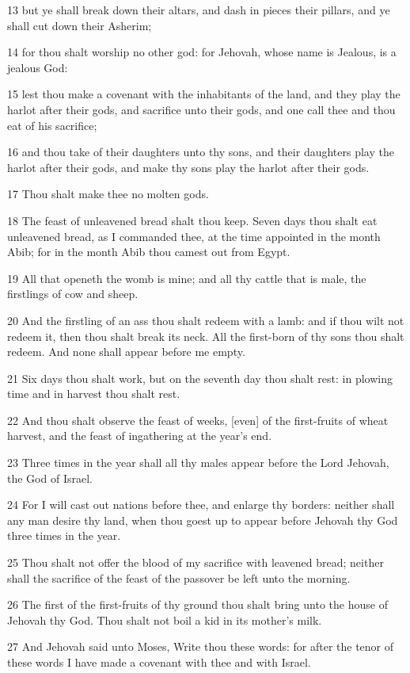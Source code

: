 \par 13 but ye shall break down their altars, and dash in pieces their pillars, and ye shall cut down their Asherim;
\par 14 for thou shalt worship no other god: for Jehovah, whose name is Jealous, is a jealous God:
\par 15 lest thou make a covenant with the inhabitants of the land, and they play the harlot after their gods, and sacrifice unto their gods, and one call thee and thou eat of his sacrifice;
\par 16 and thou take of their daughters unto thy sons, and their daughters play the harlot after their gods, and make thy sons play the harlot after their gods.
\par 17 Thou shalt make thee no molten gods.
\par 18 The feast of unleavened bread shalt thou keep. Seven days thou shalt eat unleavened bread, as I commanded thee, at the time appointed in the month Abib; for in the month Abib thou camest out from Egypt.
\par 19 All that openeth the womb is mine; and all thy cattle that is male, the firstlings of cow and sheep.
\par 20 And the firstling of an ass thou shalt redeem with a lamb: and if thou wilt not redeem it, then thou shalt break its neck. All the first-born of thy sons thou shalt redeem. And none shall appear before me empty.
\par 21 Six days thou shalt work, but on the seventh day thou shalt rest: in plowing time and in harvest thou shalt rest.
\par 22 And thou shalt observe the feast of weeks, [even] of the first-fruits of wheat harvest, and the feast of ingathering at the year's end.
\par 23 Three times in the year shall all thy males appear before the Lord Jehovah, the God of Israel.
\par 24 For I will cast out nations before thee, and enlarge thy borders: neither shall any man desire thy land, when thou goest up to appear before Jehovah thy God three times in the year.
\par 25 Thou shalt not offer the blood of my sacrifice with leavened bread; neither shall the sacrifice of the feast of the passover be left unto the morning.
\par 26 The first of the first-fruits of thy ground thou shalt bring unto the house of Jehovah thy God. Thou shalt not boil a kid in its mother's milk.
\par 27 And Jehovah said unto Moses, Write thou these words: for after the tenor of these words I have made a covenant with thee and with Israel.
